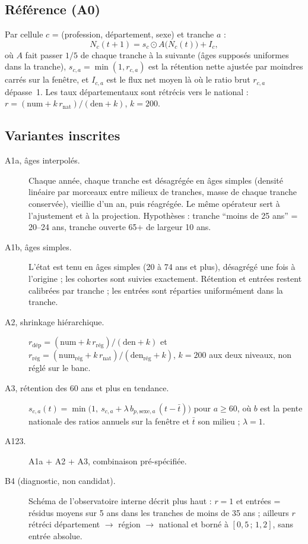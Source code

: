 \documentclass[11pt]{article}
\begin{document}
\subsection{Référence (A0)}
Par cellule $c$ = (profession, département, sexe) et tranche $a$ :
\begin{equation}
  N_{c}(t+1) = s_{c} \odot A\big(N_{c}(t)\big) + I_{c},
\end{equation}
où $A$ fait passer $1/5$ de chaque tranche à la suivante (âges supposés uniformes dans la tranche),
$s_{c,a} = \min(1, r_{c,a})$ est la rétention nette ajustée par moindres carrés sur la fenêtre, et
$I_{c,a}$ est le flux net moyen là où le ratio brut $r_{c,a}$ dépasse~1. Les taux départementaux sont
rétrécis vers le national : $r = (\text{num} + k\,r_{\text{nat}})/(\text{den} + k)$, $k = 200$\suppose.

\subsection{Variantes inscrites}
\begin{description}
  \item[A1a, âges interpolés.] Chaque année, chaque tranche est désagrégée en âges simples (densité
        linéaire par morceaux entre milieux de tranches, masse de chaque tranche conservée), vieillie
        d'un an, puis réagrégée. Le même opérateur sert à l'ajustement et à la projection. Hypothèses :
        tranche \enquote{moins de 25 ans} = 20--24 ans\suppose, tranche ouverte 65+ de largeur
        10 ans\suppose.
  \item[A1b, âges simples.] L'état est tenu en âges simples (20 à 74 ans et plus), désagrégé une fois à
        l'origine ; les cohortes sont suivies exactement. Rétention et entrées restent calibrées par
        tranche ; les entrées sont réparties uniformément dans la tranche\suppose.
  \item[A2, shrinkage hiérarchique.] $r_{\text{dép}} = (\text{num} + k\,r_{\text{rég}})/(\text{den} + k)$
        et $r_{\text{rég}} = (\text{num}_{\text{rég}} + k\,r_{\text{nat}})/(\text{den}_{\text{rég}} + k)$,
        $k = 200$\suppose{} aux deux niveaux, non réglé sur le banc.
  \item[A3, rétention des 60 ans et plus en tendance.]
        $s_{c,a}(t) = \min\!\big(1,\ s_{c,a} + \lambda\, b_{p,\text{sexe},a}\,(t - \bar t)\big)$ pour
        $a \ge 60$, où $b$ est la pente nationale des ratios annuels sur la fenêtre et $\bar t$ son
        milieu ; $\lambda = 1$.
  \item[A123.] A1a + A2 + A3, combinaison pré-spécifiée.
  \item[B4 (diagnostic, non candidat).] Schéma de l'observatoire interne décrit plus haut : $r = 1$
        et entrées = résidus moyens sur 5 ans dans les tranches de moins de 35 ans ; ailleurs $r$
        rétréci département $\to$ région $\to$ national et borné à $[0{,}5\,;\,1{,}2]$, sans entrée
        absolue.
\end{description}
\end{document}
